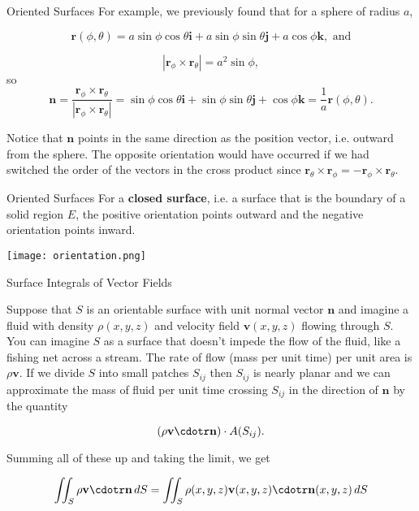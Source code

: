 \documentclass[11pt,english,
handout
]{beamer}
\begin{document}
\begin{frame}[t]{Oriented Surfaces}
\small
For example, we previously found that for a sphere of radius $a$,

\[
\mathbf{r}(\phi,\theta)=a\sin\phi\cos\theta\mathbf{i}+a\sin\phi\sin\theta\mathbf{j}+a\cos\phi\mathbf{k},\text{ and}
\]

\[
|\mathbf{r}_\phi\times\mathbf{r}_\theta|=a^2\sin\phi,
\]
so
\[
\mathbf{n}=\frac{\mathbf{r}_\phi\times\mathbf{r}_\theta}{|\mathbf{r}_\phi\times\mathbf{r}_\theta|}=\sin\phi\cos\theta\mathbf{i}+\sin\phi\sin\theta\mathbf{j}+\cos\phi\mathbf{k}=\frac{1}{a}\mathbf{r}(\phi,\theta).
\]\pause 

Notice that $\mathbf{n}$ points in the same direction as the position vector, i.e. outward from the sphere. The opposite orientation would have occurred if we had switched the order of the vectors in the cross product since $\mathbf{r}_\theta\times\mathbf{r}_\phi=-\mathbf{r}_\phi\times\mathbf{r}_\theta$.
\end{frame}








\begin{frame}[t]{Oriented Surfaces}
\small
For a \textbf{closed surface}, i.e. a surface that is the boundary of a solid region $E$, the positive orientation points outward and the negative orientation points inward.

\begin{center}
\texttt{[image: orientation.png]}
\end{center}
\end{frame}









\begin{frame}{Surface Integrals of Vector Fields}
\small

Suppose that $S$ is an orientable surface with unit normal vector $\mathbf{n}$ and imagine a fluid with density $\rho(x,y,z)$ and velocity field $\mathbf{v}(x,y,z)$ flowing through $S$. \pause You can imagine $S$ as a surface that doesn't impede the flow of the fluid, like a fishing net across a stream. The rate of flow (mass per unit time) per unit area is $\rho\mathbf{v}$. \pause If we divide $S$ into small patches $S_{ij}$ then $S_{ij}$ is nearly planar and we can approximate the mass of fluid per unit time crossing $S_{ij}$ in the direction of $\mathbf{n}$ by the quantity

\[
(\rho\mathbf{v}\cdotr\mathbf{n})\cdot A(S_{ij}).
\]\pause 

Summing all of these up and taking the limit, we get

\[
\iint_S\rho\mathbf{v}\cdotr\mathbf{n}\,dS=\iint_S\rho(x,y,z)\mathbf{v}(x,y,z)\cdotr\mathbf{n}(x,y,z)\,dS
\]
\end{frame}
\end{document}
